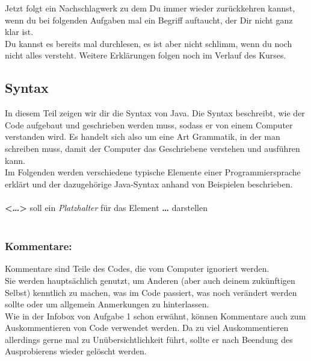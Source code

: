 

\label{ex2}

Jetzt folgt ein Nachschlagwerk zu dem Du immer wieder zurückkehren kannst, wenn du bei folgenden Aufgaben mal ein Begriff auftaucht, der Dir nicht ganz klar ist.\\
Du kannst es bereits mal durchlesen, es ist aber nicht schlimm, wenn du noch nicht alles versteht. Weitere Erklärungen folgen noch im Verlauf des Kurses.\\

\subsection*{Syntax}
\noindent
In diesem Teil zeigen wir dir die Syntax von Java.
Die Syntax beschreibt, wie der Code aufgebaut und geschrieben werden muss, sodass er von einem Computer verstanden wird. Es handelt sich also um eine Art Grammatik, in der man schreiben muss, damit der Computer das Geschriebene verstehen und ausführen kann.\\
Im Folgenden werden verschiedene typische Elemente einer Programmiersprache erklärt und der dazugehörige Java-Syntax anhand von Beispielen beschrieben.\\\\
\hspace*{\fill}\textbf{<\dots>} soll ein \textit{Platzhalter} für das Element \textbf{\dots} darstellen\hspace*{\fill}\\\\

\begin{Infobox}
	\subsubsection*{Kommentare:}
	Kommentare sind Teile des Codes, die vom Computer ignoriert werden.\\
	Sie werden hauptsächlich genutzt, um Anderen (aber auch deinem zukünftigen Selbst) kenntlich zu machen, was im Code passiert, was noch verändert werden sollte oder um allgemein Anmerkungen zu hinterlassen.\\
	Wie in der Infobox von Aufgabe 1 schon erwähnt, können Kommentare auch zum Auskommentieren von Code verwendet werden. Da zu viel Auskommentieren allerdings gerne mal zu Unübersichtlichkeit führt, sollte er nach Beendung des Ausprobierens wieder gelöscht werden.
\end{Infobox}


